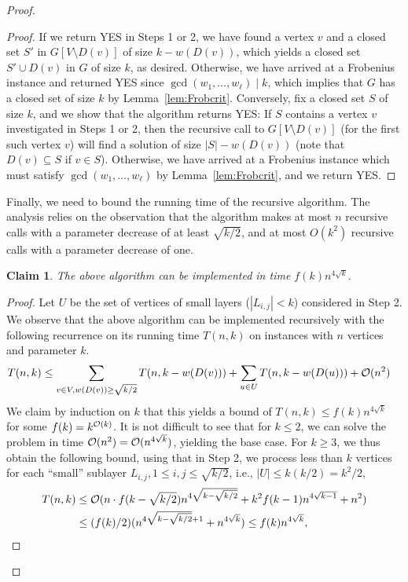 \documentclass[10pt,a4paper]{article}
\newtheorem{claim}[thm]{Claim}
\newcommand{\Oh}{{\cal O}}
\newcommand{\divides}{\mid}
\newcommand{\cqed}{}
\begin{document}
\begin{proof}
\begin{proof}
If we return YES in Steps 1 or 2, we have found a vertex $v$ and a closed set $S'$ in $G[V\setminus D(v)]$ of size $k-w(D(v))$, which yields a closed set $S'\cup D(v)$ in $G$ of size $k$, as desired. Otherwise, we have arrived at a Frobenius instance and returned YES since $\gcd(w_1,\dots, w_\ell)\divides k$, which implies that $G$ has a closed set of size $k$ by Lemma~\ref{lem:Frobcrit}.
%
Conversely, fix a closed set $S$ of size $k$, and we show that the algorithm returns YES:
If $S$ contains a vertex $v$ investigated in Steps 1 or 2, then the recursive call to $G[V\setminus D(v)]$ (for the first such vertex $v$) will find a solution of size $|S|-w(D(v))$ (note that $D(v) \subseteq S$ if $v\in S$). Otherwise, we have arrived at a Frobenius instance which must satisfy $\gcd(w_1,\dots, w_\ell)$ by Lemma~\ref{lem:Frobcrit}, and we return YES.
\cqed\end{proof}
%
Finally, we need to bound the running time of the recursive algorithm. The analysis relies on the observation that the algorithm makes at most $n$ recursive calls with a parameter decrease of at least $\sqrt{k/2}$, and at most $O(k^2)$ recursive calls with a parameter decrease of one.
\begin{claim}\label{cl:imp2}
The above algorithm can be implemented in time $f(k) n^{4\sqrt{k}}$.
\end{claim}
\begin{proof}
Let $U$ be the set of vertices of small layers ($|L_{i,j}| < k$) considered in Step 2. We observe that the above algorithm can be implemented recursively with the following recurrence on its running time $T(n,k)$ on instances with $n$ vertices and parameter $k$.
\begin{align*}
T(n,k) & \le \sum_{v\in V, w(D(v)) \ge \sqrt{k/2}} T(n, k-w(D(v))) + \sum_{u \in U} T(n,k-w(D(u))) + \Oh(n^2) 
\end{align*}
We claim by induction on $k$ that this yields a bound of $T(n,k) \le f(k) n^{4\sqrt{k}}$ for some $f(k) = k^{\Oh(k)}$. It is not difficult to see that for $k\le 2$, we can solve the problem in time $\Oh(n^2) = \Oh(n^{4\sqrt{k}})$, yielding the base case. For $k\ge 3$, we thus obtain the following bound, using that in Step 2, we process less than $k$ vertices for each ``small'' sublayer $L_{i,j}, 1\le i,j \le \sqrt{k/2}$, i.e., $|U|\le k (k/2) = k^2/2$,
\begin{align*}
T(n,k) & \le \Oh(n \cdot f(k-\sqrt{k/2}) n^{4\sqrt{k-\sqrt{k/2}}} + k^2 f(k-1) n^{4\sqrt{k-1}} + n^2) \\
   & \le (f(k)/2) (n^{4\sqrt{k-\sqrt{k/2}}+1} + n^{4\sqrt{k}}) \le f(k)n^{4\sqrt{k}},

\end{align*}
\end{proof}
\end{proof}
\end{document}
